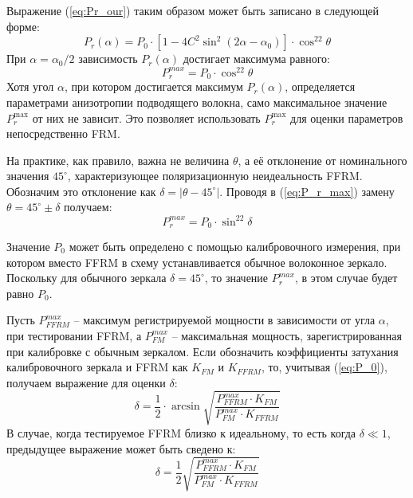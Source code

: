 \documentclass{article}
\begin{document}
Выражение (\ref{eq:Pr_our}) таким образом может быть записано в следующей форме:
\begin{equation}
    \label{eq:Pr_our_1}
    P_r(\alpha)=P_0\cdot\left[1-4C^2\sin^2(2\alpha-\alpha_0)\right]\cdot\cos^22\theta
\end{equation}
При $\alpha=\alpha_0/2$ зависимость $P_r(\alpha)$ достигает максимума равного:
\begin{equation}
    \label{eq:P_r_max}
    P_r^{max}=P_0\cdot\cos^22\theta
\end{equation} 
Хотя угол $\alpha$, при котором достигается максимум $P_r(\alpha)$, определяется параметрами анизотропии подводящего волокна, само максимальное значение $P_r^{\max}$ от них не зависит.
Это позволяет использовать $P_r^{\max}$ для оценки параметров непосредственно FRM.

На практике, как правило, важна не величина $\theta$, а её отклонение от номинального значения $45^\circ$, характеризующее поляризационную неидеальность FFRM.
Обозначим это отклонение как $\delta =| \theta - 45^\circ|$.
Проводя в (\ref{eq:P_r_max}) замену $\theta = 45^\circ \pm \delta$ получаем:
\begin{equation}
    \label{eq:P_r_max_1}
    P_r^{max}=P_0\cdot\sin^22\delta
\end{equation} 

Значение $P_0$ может быть определено с помощью калибровочного измерения, при котором вместо FFRM в схему устанавливается обычное волоконное зеркало.
Поскольку для обычного зеркала $\delta = 45^\circ$, то значение $P_r^{max}$, в этом случае будет равно $P_0$.

Пусть $P_{FFRM}^{max}$ – максимум регистрируемой мощности в зависимости от угла $\alpha$, при тестировании FFRM, а $P_{FM}^{max}$ – максимальная мощность, зарегистрированная при калибровке с обычным зеркалом.
Если обозначить коэффициенты затухания калибровочного зеркала и FFRM как $K_{FM}$ и $K_{FFRM}$, то, учитывая (\ref{eq:P_0}), получаем выражение для оценки $\delta$:
\begin{equation}
    \label{eq:delta}
    \delta =\frac{1}{2}\cdot\arcsin\sqrt{\frac{P_{FFRM}^{max}\cdot K_{FM}}{P_{FM}^{max}\cdot K_{FFRM}}}
\end{equation}
В случае, когда тестируемое FFRM близко к идеальному, то есть когда $\delta \ll 1$, предыдущее выражение может быть сведено к:
\begin{equation}
    \label{eq:delta_est}
    \delta =\frac{1}{2}\sqrt{\frac{P_{FFRM}^{max}\cdot K_{FM}}{P_{FM}^{max}\cdot K_{FFRM}}}
\end{equation}
\end{document}
